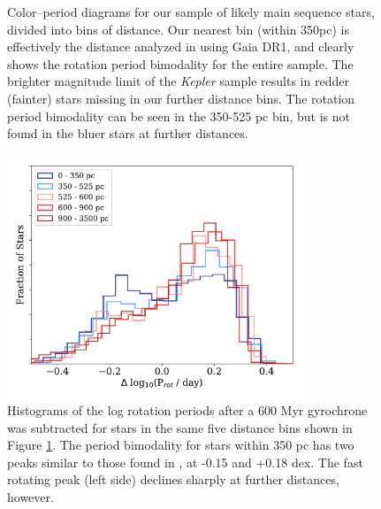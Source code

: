 \documentclass[preprint2]{aastex62}
\newcommand{\Kepler}{\textsl{Kepler}\xspace}
\begin{document}
\begin{figure}[]
\caption{Color--period diagrams for our sample of likely main sequence stars, divided into bins of distance. Our nearest bin (within 350pc) is effectively the distance analyzed in \citet{davenport2017} using Gaia DR1, and clearly shows the rotation period bimodality for the entire sample. The brighter magnitude limit of the \Kepler sample results in redder (fainter) stars missing in our further distance bins. The rotation period bimodality can be seen in the 350-525 pc bin, but is not found in the bluer stars at further distances.
}
\label{fig:color_period}
\end{figure}



%


\begin{figure}[]
\centering
\includegraphics[width=3.5in]{../figures/delta_per}
\caption{Histograms of the log rotation periods after a 600 Myr gyrochrone was subtracted for stars in the same five distance bins shown in Figure \ref{fig:color_period}. The period bimodality for stars within 350 pc has two peaks similar to those found in \citet{davenport2017}, at -0.15 and +0.18 dex. The fast rotating peak (left side) declines sharply at further distances, however.
}
\label{fig:per_hist}
\end{figure}
\end{document}
